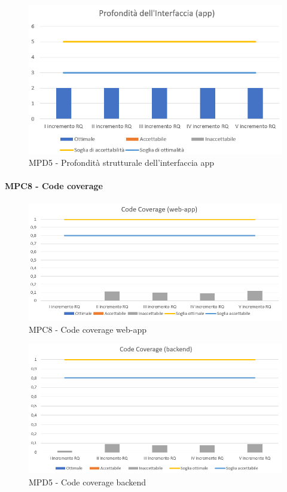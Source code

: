   \begin{figure}[h!]
    \centering
      \includegraphics[scale=1]{Immagini/ProfInter APP.PNG}
    \caption{MPD5 - Profondità strutturale dell’interfaccia app}
  \end{figure}






  \newpage
  \paragraph{MPC8 - Code coverage}
  \begin{figure}[h!]
    \centering
      \includegraphics[scale=1]{Immagini/CodeCov WA.PNG}
    \caption{MPC8 - Code coverage web-app}
  \end{figure}

  \begin{figure}[h!]
    \centering
      \includegraphics[scale=1]{Immagini/CodeCov BE.PNG}
    \caption{MPD5 - Code coverage backend}
  \end{figure}



